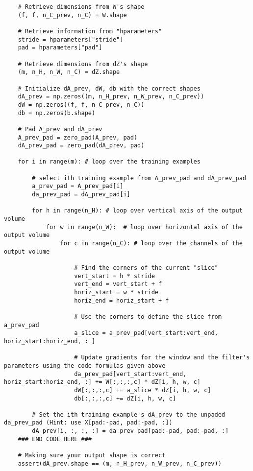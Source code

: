 {\begin{verbatim}
    # Retrieve dimensions from W's shape
    (f, f, n_C_prev, n_C) = W.shape
    
    # Retrieve information from "hparameters"
    stride = hparameters["stride"]
    pad = hparameters["pad"]
    
    # Retrieve dimensions from dZ's shape
    (m, n_H, n_W, n_C) = dZ.shape
    
    # Initialize dA_prev, dW, db with the correct shapes
    dA_prev = np.zeros((m, n_H_prev, n_W_prev, n_C_prev))                           
    dW = np.zeros((f, f, n_C_prev, n_C))
    db = np.zeros(b.shape)

    # Pad A_prev and dA_prev
    A_prev_pad = zero_pad(A_prev, pad)
    dA_prev_pad = zero_pad(dA_prev, pad)
    
    for i in range(m): # loop over the training examples
        
        # select ith training example from A_prev_pad and dA_prev_pad
        a_prev_pad = A_prev_pad[i]
        da_prev_pad = dA_prev_pad[i]
        
        for h in range(n_H): # loop over vertical axis of the output volume
            for w in range(n_W):  # loop over horizontal axis of the output volume
                for c in range(n_C): # loop over the channels of the output volume
                    
                    # Find the corners of the current "slice"
                    vert_start = h * stride
                    vert_end = vert_start + f
                    horiz_start = w * stride
                    horiz_end = horiz_start + f
                    
                    # Use the corners to define the slice from a_prev_pad
                    a_slice = a_prev_pad[vert_start:vert_end, horiz_start:horiz_end, : ] 

                    # Update gradients for the window and the filter's parameters using the code formulas given above
                    da_prev_pad[vert_start:vert_end, horiz_start:horiz_end, :] += W[:,:,:,c] * dZ[i, h, w, c]
                    dW[:,:,:,c] += a_slice * dZ[i, h, w, c]
                    db[:,:,:,c] += dZ[i, h, w, c]
                    
        # Set the ith training example's dA_prev to the unpaded da_prev_pad (Hint: use X[pad:-pad, pad:-pad, :])
        dA_prev[i, :, :, :] = da_prev_pad[pad:-pad, pad:-pad, :]
    ### END CODE HERE ###
    
    # Making sure your output shape is correct
    assert(dA_prev.shape == (m, n_H_prev, n_W_prev, n_C_prev))
    

\end{verbatim}}
